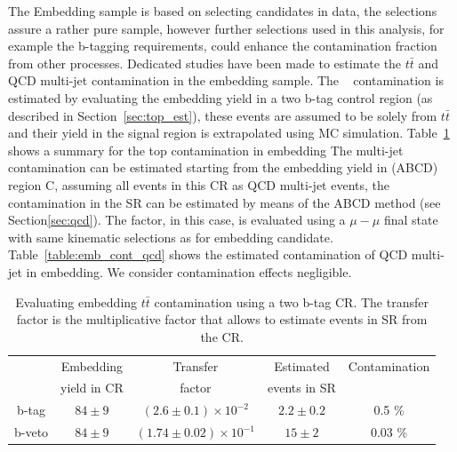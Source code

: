 
The Embedding sample is based on selecting \Zmumu candidates in data, the selections assure a rather 
pure \Zmumu sample, however further selections used in this analysis, for example the b-tagging requirements, 
could enhance the contamination fraction from other processes. Dedicated studies have been
made to estimate the $t\bar{t}$ and QCD multi-jet contamination in the embedding sample.
The \ttbar~ contamination is estimated by evaluating the embedding yield in a two b-tag control region
(as described in Section~\ref{sec:top_est}), these events are assumed to be solely from $t\bar{t}$
and their yield in the signal region is extrapolated using MC simulation.
Table~\ref{table:emb_cont_tt} shows a summary for the top contamination in embedding 
The multi-jet contamination can be estimated starting 
from the embedding yield in (ABCD) region C,
assuming all events in this CR as QCD multi-jet events, the contamination in the SR 
can be estimated by means of the ABCD method (see Section\ref{sec:qcd}). The \rqcd factor, in this case, 
is evaluated using a $\mu-\mu$ final state with same kinematic selections as for embedding \Zmumu candidate.
Table~\ref{table:emb_cont_qcd}
shows the estimated contamination of QCD multi-jet in embedding. 
We  consider contamination effects negligible.


\begin{table} [tp]
\centering
\begin{tabular}{c c c c c}
\hline
\hline
 & Embedding	& Transfer	& Estimated	& Contamination \\
 & yield in CR	& factor	& events in SR	&	\\		 [0.5ex]
\hline
b-tag & $84 \pm 9$  & $(2.6 \pm 0.1) \times 10^{-2}$ &  $2.2 \pm 0.2$&  0.5 \% \\
b-veto & $84 \pm 9$ & $(1.74 \pm 0.02) \times 10^{-1}$ & $15 \pm 2$ & 0.03 \% \\[1ex]
\hline
\end{tabular}
\caption{Evaluating embedding $t\bar{t}$ contamination using a two b-tag CR. The transfer factor is the
multiplicative factor that allows to estimate events in SR from the CR. }
\label{table:emb_cont_tt}
\end{table}

